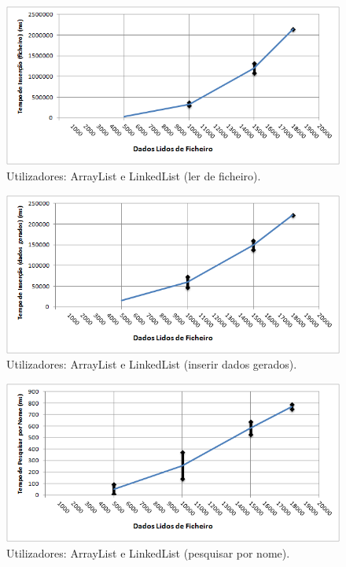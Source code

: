\documentclass[a5paper,twocolumn, 11pt]{article}
\begin{document}
\begin{figure}[h!b!t!]
    \caption[Utilizadores: ArrayList e Linked List (ler de ficheiro)]{Utilizadores: ArrayList e LinkedList (ler de ficheiro).}
    \label{hashtable}
    \centering
        \includegraphics[width=400pt]{user_c2_o1.png}
\end{figure}
\begin{figure}[h!b!t!]
    \caption[Utilizadores: ArrayList e Linked List (inserir dados gerados)]{Utilizadores: ArrayList e LinkedList (inserir dados gerados).}
    \label{hashtable}
    \centering
        \includegraphics[width=400pt]{user_c2_o2.png}
\end{figure}
\begin{figure}[h!b!t!]
    \caption[Utilizadores: ArrayList e Linked List (pesquisar por nome)]{Utilizadores: ArrayList e LinkedList (pesquisar por nome).}
    \label{hashtable}
    \centering
        \includegraphics[width=400pt]{user_c2_o3.png}
\end{figure}
\end{document}

